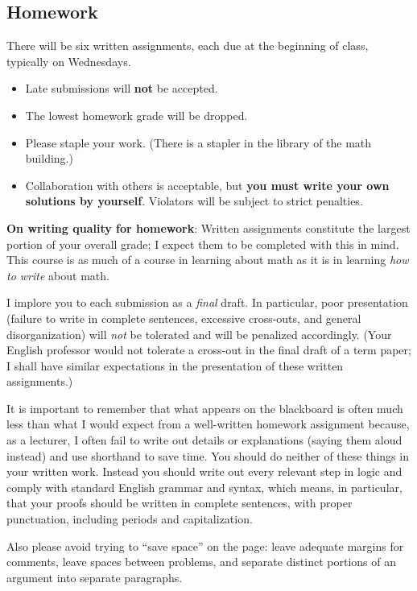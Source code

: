 \documentclass[12pt]{article}
\begin{document}
\subsection*{Homework}

There will be six written assignments, each due at the beginning of class, typically on Wednesdays. 
\begin{itemize}
\item Late submissions will \textbf{not} be accepted. 
\item The lowest homework grade will be dropped. 
\item Please staple your work. (There is a stapler in the library of the math building.)
\item Collaboration with others is acceptable, but \textbf{you must write your own solutions by yourself}. Violators will be subject to strict penalties. 
\end{itemize} 

\noindent \textbf{On writing quality for homework}: Written assignments constitute the largest portion of your overall grade; I expect them to be completed with this in mind. This course is as much of a course in learning about math as it is in learning \emph{how to write} about math. 

I implore you to each submission as a \emph{final} draft. In particular, poor presentation (failure to write in complete sentences, excessive cross-outs, and general disorganization) will \emph{not} be tolerated and will be penalized accordingly. (Your English professor would not tolerate a cross-out in the final draft of a term paper; I shall have similar expectations in the presentation of these written assignments.)

It is important to remember that what appears on the blackboard is often much less than what I would expect from a well-written homework assignment because, as a lecturer, I often fail to write out details or explanations (saying them aloud instead) and use shorthand to save time. You should do neither of these things in your written work. Instead you should write out every relevant step in logic and comply with standard English grammar and syntax, which means, in particular, that your proofs should be written in complete sentences, with proper punctuation, including periods and capitalization. 

Also please avoid trying to ``save space'' on the page: leave adequate margins for comments, leave spaces between problems, and separate distinct portions of an argument into separate paragraphs. 
\end{document}

